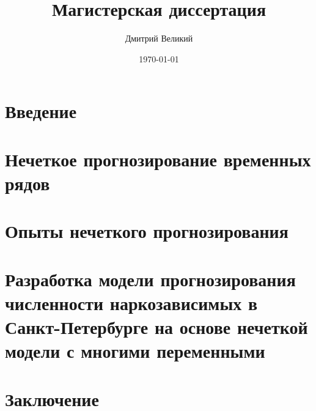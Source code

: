 \documentclass[a4paper,14pt]{report}
\author{Дмитрий Великий}
\title{Магистерская диссертация}
\date{\today}
\begin{document}

\tableofcontents
\chapter{Введение}

\chapter{Нечеткое прогнозирование временных рядов}

\chapter{Опыты нечеткого прогнозирования}

\chapter{Разработка модели прогнозирования численности наркозависимых в 
Санкт-Петербурге на основе нечеткой модели с многими переменными}

\chapter{Заключение}

\newpage
\printbibliography[heading=bibintoc]
\end{document}
